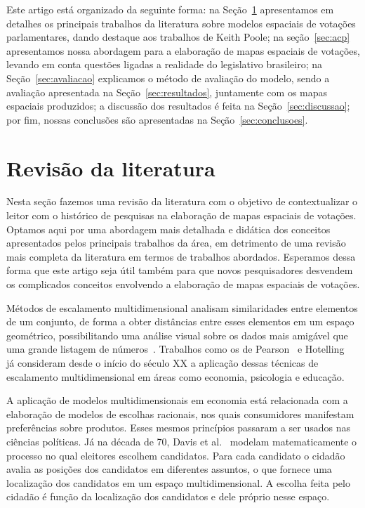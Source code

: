 \documentclass[a4paper, 12pt]{article}
\begin{document}
Este artigo está organizado da seguinte forma: na Seção~\ref{sec:revbib} apresentamos em detalhes os principais trabalhos da literatura sobre modelos espaciais de votações parlamentares, dando destaque aos trabalhos de Keith Poole; na seção~\ref{sec:acp} apresentamos nossa abordagem para a elaboração de mapas espaciais de votações, levando em conta questões ligadas a realidade do legislativo brasileiro; na Seção~\ref{sec:avaliacao} explicamos o método de avaliação do modelo, sendo a avaliação apresentada na Seção~\ref{sec:resultados}, juntamente com os mapas espaciais produzidos; a discussão dos resultados é feita na Seção~\ref{sec:discussao}; por fim, nossas conclusões são apresentadas na Seção~\ref{sec:conclusoes}.



\section{Revisão da literatura}
\label{sec:revbib}

Nesta seção fazemos uma revisão da literatura com o objetivo de contextualizar o leitor com o histórico de pesquisas na elaboração de mapas espaciais de votações. Optamos aqui por uma abordagem mais detalhada e didática dos conceitos apresentados pelos principais trabalhos da área, em detrimento de uma revisão mais completa da literatura em termos de trabalhos abordados. Esperamos dessa forma que este artigo seja útil também para que novos pesquisadores desvendem os complicados conceitos envolvendo a elaboração de mapas espaciais de votações. 

Métodos de escalamento multidimensional analisam similaridades entre elementos de um conjunto, de forma a obter distâncias entre esses elementos em um espaço geométrico, possibilitando uma análise visual sobre os dados mais amigável que uma grande listagem de números~\cite{borg2005mds}. Trabalhos como os de Pearson~\cite{pearson1901} e Hotelling~\cite{hotelling1933} já consideram desde o início do século XX a aplicação dessas técnicas de escalamento multidimensional em áreas como economia, psicologia e educação.

A aplicação de modelos multidimensionais em economia está relacionada com a elaboração de modelos de escolhas racionais, nos quais consumidores manifestam preferências sobre produtos. Esses mesmos princípios passaram a ser usados nas ciências políticas. Já na década de 70, Davis et al.~\cite{davis1970electoral} modelam matematicamente o processo no qual eleitores escolhem candidatos. Para cada candidato o cidadão avalia as posições dos candidatos em diferentes assuntos, o que fornece uma localização dos candidatos em um espaço multidimensional. A escolha feita pelo cidadão é função da localização dos candidatos e dele próprio nesse espaço. 
\end{document}

